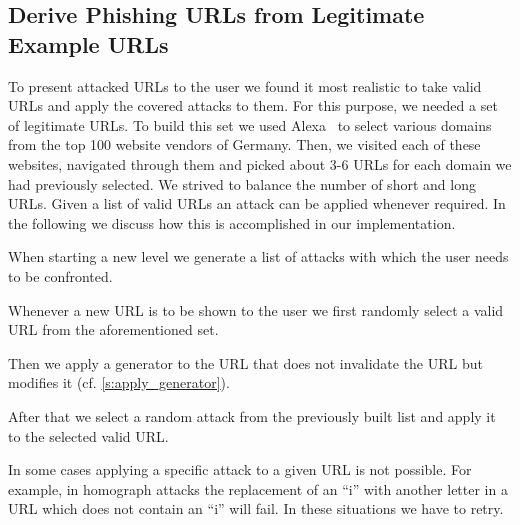 \subsection{Derive Phishing URLs from Legitimate Example URLs}
To present attacked URLs to the user we found it most realistic to take valid URLs and apply the covered attacks to them.
For this purpose, we needed a set of legitimate URLs.
To build this set we used Alexa~\cite{alexa} to select various domains from the top 100 website vendors of Germany.
Then, we visited each of these websites, navigated through them and picked about 3-6 URLs for each domain we had previously selected.
We strived to balance the number of short and long URLs.
Given a list of valid URLs an attack can be applied whenever required.
In the following we discuss how this is accomplished in our implementation.
\begin{description}[leftmargin=0cm]
\item[Generate a List of Attacks for Each Level:] When starting a new level we generate a list of attacks with which the user needs to be confronted.
\item[Select a Valid URL:] Whenever a new URL is to be shown to the user we first randomly select a valid URL from the aforementioned set.
\item[Modify Valid URLs with a Generator:] Then we apply a generator to the URL that does not invalidate the URL but modifies it (cf. \autoref{s:apply_generator}).
\item[Apply an Attack:] After that we select a random attack from the previously built list and apply it to the selected valid URL.
\item[Repeat in Case Attack was not Possible:] In some cases applying a specific attack to a given URL is not possible. For example, in homograph attacks the replacement of an ``i'' with another letter in a URL which does not contain an ``i'' will fail. In these situations we have to retry.
\end{description}

